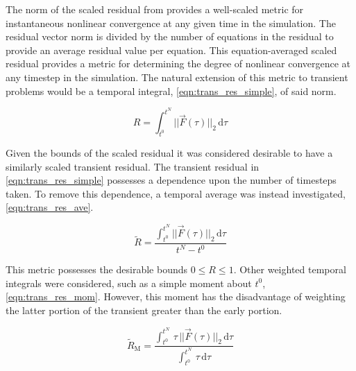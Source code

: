 The norm of the scaled residual from  provides a well-scaled metric for instantaneous nonlinear convergence at any given time in the simulation.
The residual vector norm is divided by the number of equations in the residual to provide an average residual value per equation.
This equation-averaged scaled residual provides a metric for determining the degree of nonlinear convergence at any timestep in the simulation.
The natural extension of this metric to transient problems would be a temporal integral, \eqref{eqn:trans_res_simple}, of said norm.

\begin{equation}
\label{eqn:trans_res_simple}
R = \int_{t^{0}}^{t^{N}} ||\vec{F}(\tau)||_2 \,\mathrm{d} \tau
\end{equation}

Given the bounds of the scaled residual it was considered desirable to have a similarly scaled transient residual.
The transient residual in \eqref{eqn:trans_res_simple} possesses a dependence upon the number of timesteps taken.
To remove this dependence, a temporal average was instead investigated, \eqref{eqn:trans_res_ave}.

\begin{equation}
\label{eqn:trans_res_ave}
\tilde{R} = \frac{\int_{t^{0}}^{t^{N}} ||\vec{F}(\tau)||_2 \,\mathrm{d} \tau}{t^{N} - t^{0}}
\end{equation}

This metric possesses the desirable bounds $0 \leq R \leq 1$.
Other weighted temporal integrals were considered, such as a simple moment about $t^{0}$, \eqref{eqn:trans_res_mom}.
However, this moment has the disadvantage of weighting the latter portion of the transient greater than the early portion.

\begin{equation}
\label{eqn:trans_res_mom}
\tilde{R}_{\text{M}} = \frac{\int_{t^{0}}^{t^{N}} \,\tau\,||\vec{F}(\tau)||_2 \,\mathrm{d} \tau}{\int_{t^{0}}^{t^{N}} \,\tau \,\mathrm{d} \tau}
\end{equation}

